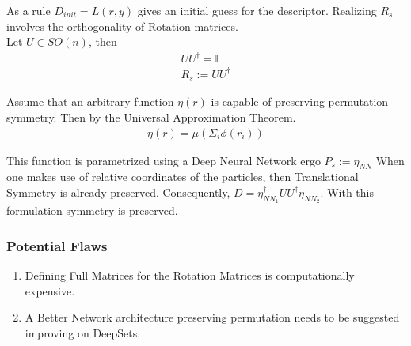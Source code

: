 As a rule $ D_{init} = L(r,y)$ gives an initial guess for the descriptor.
Realizing $R_{s}$ involves the orthogonality of Rotation matrices. \\ 

Let $U \in SO(n)$, then 
\begin{align*}
    U U^{\dag} = \mathbb{I} \\ 
    R_{s} := UU^{\dag} 
\end{align*}

Assume that an arbitrary function $\eta(r)$ is capable of preserving permutation symmetry.
Then by the Universal Approximation Theorem.
\begin{align*}
    \eta(r) = \mu(\Sigma_{i} \phi(r_i))
\end{align*}

This function is parametrized using a Deep Neural Network ergo $P_{s} := \eta_{NN}$ 
When one makes use of relative coordinates of the particles, then Translational Symmetry is already preserved.
Consequently, $D = \eta_{NN_{1}}^{\dag} U U^{\dag} \eta_{NN_{2}}$. With this formulation symmetry is preserved.

\subsubsection*{Potential Flaws}
\begin{enumerate}
    \item Defining Full Matrices for the Rotation Matrices is computationally expensive.
    \item A Better Network architecture preserving permutation needs to be suggested improving on DeepSets.
\end{enumerate}